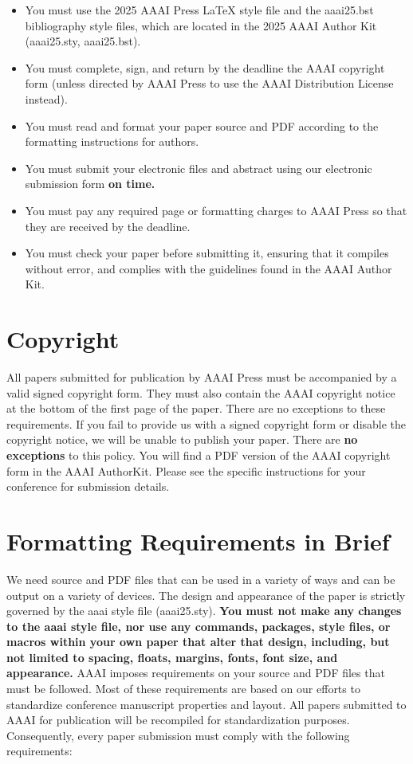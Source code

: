 \documentclass[letterpaper]{article} %
\begin{document}
\begin{itemize}
\item You must use the 2025 AAAI Press \LaTeX{} style file and the aaai25.bst bibliography style files, which are located in the 2025 AAAI Author Kit (aaai25.sty, aaai25.bst).
\item You must complete, sign, and return by the deadline the AAAI copyright form (unless directed by AAAI Press to use the AAAI Distribution License instead).
\item You must read and format your paper source and PDF according to the formatting instructions for authors.
\item You must submit your electronic files and abstract using our electronic submission form \textbf{on time.}
\item You must pay any required page or formatting charges to AAAI Press so that they are received by the deadline.
\item You must check your paper before submitting it, ensuring that it compiles without error, and complies with the guidelines found in the AAAI Author Kit.
\end{itemize}

\section{Copyright}
All papers submitted for publication by AAAI Press must be accompanied by a valid signed copyright form. They must also contain the AAAI copyright notice at the bottom of the first page of the paper. There are no exceptions to these requirements. If you fail to provide us with a signed copyright form or disable the copyright notice, we will be unable to publish your paper. There are \textbf{no exceptions} to this policy. You will find a PDF version of the AAAI copyright form in the AAAI AuthorKit. Please see the specific instructions for your conference for submission details.

\section{Formatting Requirements in Brief}
We need source and PDF files that can be used in a variety of ways and can be output on a variety of devices. The design and appearance of the paper is strictly governed by the aaai style file (aaai25.sty).
\textbf{You must not make any changes to the aaai style file, nor use any commands, packages, style files, or macros within your own paper that alter that design, including, but not limited to spacing, floats, margins, fonts, font size, and appearance.} AAAI imposes requirements on your source and PDF files that must be followed. Most of these requirements are based on our efforts to standardize conference manuscript properties and layout. All papers submitted to AAAI for publication will be recompiled for standardization purposes. Consequently, every paper submission must comply with the following requirements:
\end{document}
